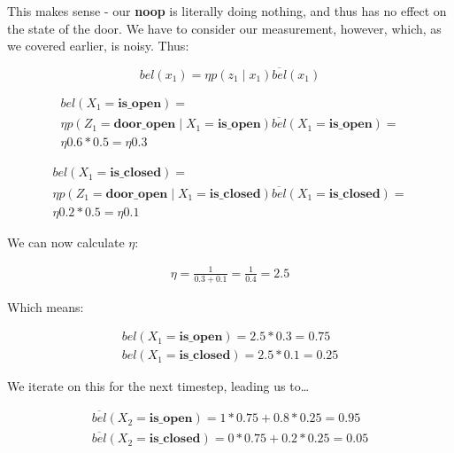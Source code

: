 \documentclass{article}
\begin{document}
This makes sense - our \textbf{noop} is literally doing nothing, and thus has no effect on the state of the door. We have to consider our measurement, however, which, as we covered earlier, is noisy. Thus:

\begin{equation}
    bel(x_1) = \eta p(z_1 \mid x_1) \overline{bel}(x_1)
\end{equation}

\begin{equation}
    \begin{split}
        bel(X_1 = \textbf{is\_open}) = \\
        \eta p(Z_1 = \textbf{door\_open} \mid X_1 = \textbf{is\_open}) \overline{bel}(X_1 = \textbf{is\_open}) = \\
        \eta 0.6 * 0.5 = \eta 0.3
    \end{split}
\end{equation}

\begin{equation}
    \begin{split}
        bel(X_1 = \textbf{is\_closed}) = \\
        \eta p(Z_1 = \textbf{door\_open} \mid X_1 = \textbf{is\_closed}) \overline{bel}(X_1 = \textbf{is\_closed}) = \\
        \eta 0.2 * 0.5 = \eta 0.1
    \end{split}
\end{equation}

We can now calculate $\eta$:

\begin{equation}
    \begin{split}
        \eta = \frac{1}{0.3 + 0.1} = \frac{1}{0.4} = 2.5
    \end{split}
\end{equation}

Which means:

\begin{equation}
    \begin{split}
        bel(X_1 = \textbf{is\_open}) = 2.5 * 0.3 = 0.75 \\
        bel(X_1 = \textbf{is\_closed}) = 2.5 * 0.1 = 0.25
    \end{split}
\end{equation}

We iterate on this for the next timestep, leading us to\dots

\begin{equation}
    \begin{split}
        \overline{bel}(X_2=\textbf{is\_open}) = 1 * 0.75 + 0.8 * 0.25 = 0.95 \\
        \overline{bel}(X_2=\textbf{is\_closed}) = 0 * 0.75 + 0.2 * 0.25 = 0.05 \\
    \end{split}
\end{equation}
\end{document}
